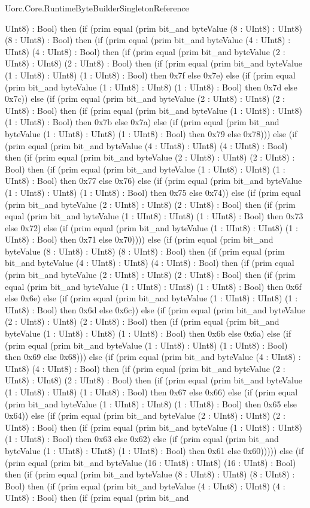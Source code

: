 \begin{lexlean}{Uorc.Core.RuntimeByteBuilderSingletonReference}
\begin{semanticmodule}
{UInt8) : Bool) then (if (prim equal (prim bit_and byteValue (8 : UInt8) : UInt8) (8 : UInt8) : Bool) then (if (prim equal (prim bit_and byteValue (4 : UInt8) : UInt8) (4 : UInt8) : Bool) then (if (prim equal (prim bit_and byteValue (2 : UInt8) : UInt8) (2 : UInt8) : Bool) then (if (prim equal (prim bit_and byteValue (1 : UInt8) : UInt8) (1 : UInt8) : Bool) then 0x7f else 0x7e) else (if (prim equal (prim bit_and byteValue (1 : UInt8) : UInt8) (1 : UInt8) : Bool) then 0x7d else 0x7c)) else (if (prim equal (prim bit_and byteValue (2 : UInt8) : UInt8) (2 : UInt8) : Bool) then (if (prim equal (prim bit_and byteValue (1 : UInt8) : UInt8) (1 : UInt8) : Bool) then 0x7b else 0x7a) else (if (prim equal (prim bit_and byteValue (1 : UInt8) : UInt8) (1 : UInt8) : Bool) then 0x79 else 0x78))) else (if (prim equal (prim bit_and byteValue (4 : UInt8) : UInt8) (4 : UInt8) : Bool) then (if (prim equal (prim bit_and byteValue (2 : UInt8) : UInt8) (2 : UInt8) : Bool) then (if (prim equal (prim bit_and byteValue (1 : UInt8) : UInt8) (1 : UInt8) : Bool) then 0x77 else 0x76) else (if (prim equal (prim bit_and byteValue (1 : UInt8) : UInt8) (1 : UInt8) : Bool) then 0x75 else 0x74)) else (if (prim equal (prim bit_and byteValue (2 : UInt8) : UInt8) (2 : UInt8) : Bool) then (if (prim equal (prim bit_and byteValue (1 : UInt8) : UInt8) (1 : UInt8) : Bool) then 0x73 else 0x72) else (if (prim equal (prim bit_and byteValue (1 : UInt8) : UInt8) (1 : UInt8) : Bool) then 0x71 else 0x70)))) else (if (prim equal (prim bit_and byteValue (8 : UInt8) : UInt8) (8 : UInt8) : Bool) then (if (prim equal (prim bit_and byteValue (4 : UInt8) : UInt8) (4 : UInt8) : Bool) then (if (prim equal (prim bit_and byteValue (2 : UInt8) : UInt8) (2 : UInt8) : Bool) then (if (prim equal (prim bit_and byteValue (1 : UInt8) : UInt8) (1 : UInt8) : Bool) then 0x6f else 0x6e) else (if (prim equal (prim bit_and byteValue (1 : UInt8) : UInt8) (1 : UInt8) : Bool) then 0x6d else 0x6c)) else (if (prim equal (prim bit_and byteValue (2 : UInt8) : UInt8) (2 : UInt8) : Bool) then (if (prim equal (prim bit_and byteValue (1 : UInt8) : UInt8) (1 : UInt8) : Bool) then 0x6b else 0x6a) else (if (prim equal (prim bit_and byteValue (1 : UInt8) : UInt8) (1 : UInt8) : Bool) then 0x69 else 0x68))) else (if (prim equal (prim bit_and byteValue (4 : UInt8) : UInt8) (4 : UInt8) : Bool) then (if (prim equal (prim bit_and byteValue (2 : UInt8) : UInt8) (2 : UInt8) : Bool) then (if (prim equal (prim bit_and byteValue (1 : UInt8) : UInt8) (1 : UInt8) : Bool) then 0x67 else 0x66) else (if (prim equal (prim bit_and byteValue (1 : UInt8) : UInt8) (1 : UInt8) : Bool) then 0x65 else 0x64)) else (if (prim equal (prim bit_and byteValue (2 : UInt8) : UInt8) (2 : UInt8) : Bool) then (if (prim equal (prim bit_and byteValue (1 : UInt8) : UInt8) (1 : UInt8) : Bool) then 0x63 else 0x62) else (if (prim equal (prim bit_and byteValue (1 : UInt8) : UInt8) (1 : UInt8) : Bool) then 0x61 else 0x60))))) else (if (prim equal (prim bit_and byteValue (16 : UInt8) : UInt8) (16 : UInt8) : Bool) then (if (prim equal (prim bit_and byteValue (8 : UInt8) : UInt8) (8 : UInt8) : Bool) then (if (prim equal (prim bit_and byteValue (4 : UInt8) : UInt8) (4 : UInt8) : Bool) then (if (prim equal (prim bit_and }
\end{semanticmodule}
\end{lexlean}
